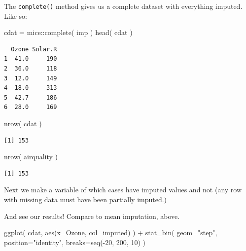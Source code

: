\documentclass[
  letterpaper,
  DIV=11,
  numbers=noendperiod]{scrreprt}
\newenvironment{Shaded}{}{}
\newcommand{\AttributeTok}[1]{\textcolor[rgb]{0.49,0.56,0.16}{#1}}
\newcommand{\DecValTok}[1]{\textcolor[rgb]{0.25,0.63,0.44}{#1}}
\newcommand{\FunctionTok}[1]{\textcolor[rgb]{0.02,0.16,0.49}{#1}}
\newcommand{\NormalTok}[1]{#1}
\newcommand{\OtherTok}[1]{\textcolor[rgb]{0.00,0.44,0.13}{#1}}
\newcommand{\SpecialCharTok}[1]{\textcolor[rgb]{0.25,0.44,0.63}{#1}}
\newcommand{\StringTok}[1]{\textcolor[rgb]{0.25,0.44,0.63}{#1}}
\begin{document}
The \texttt{complete()} method gives us a complete dataset with
everything imputed. Like so:

\begin{Shaded}
\begin{Highlighting}[]
\NormalTok{  cdat }\OtherTok{=}\NormalTok{ mice}\SpecialCharTok{::}\FunctionTok{complete}\NormalTok{( imp )}
  \FunctionTok{head}\NormalTok{( cdat )}
\end{Highlighting}
\end{Shaded}

\begin{verbatim}
  Ozone Solar.R
1  41.0     190
2  36.0     118
3  12.0     149
4  18.0     313
5  42.7     186
6  28.0     169
\end{verbatim}

\begin{Shaded}
\begin{Highlighting}[]
  \FunctionTok{nrow}\NormalTok{( cdat )}
\end{Highlighting}
\end{Shaded}

\begin{verbatim}
[1] 153
\end{verbatim}

\begin{Shaded}
\begin{Highlighting}[]
  \FunctionTok{nrow}\NormalTok{( airquality )}
\end{Highlighting}
\end{Shaded}

\begin{verbatim}
[1] 153
\end{verbatim}

Next we make a variable of which cases have imputed values and not (any
row with missing data must have been partially imputed.)

\begin{Shaded}
\end{Shaded}

And see our results! Compare to mean imputation, above.

\begin{Shaded}
\begin{Highlighting}[]
\FunctionTok{ggplot}\NormalTok{( cdat, }\FunctionTok{aes}\NormalTok{(}\AttributeTok{x=}\NormalTok{Ozone, }\AttributeTok{col=}\NormalTok{imputed) ) }\SpecialCharTok{+}
    \FunctionTok{stat\_bin}\NormalTok{( }\AttributeTok{geom=}\StringTok{"step"}\NormalTok{, }\AttributeTok{position=}\StringTok{"identity"}\NormalTok{,}
              \AttributeTok{breaks=}\FunctionTok{seq}\NormalTok{(}\SpecialCharTok{{-}}\DecValTok{20}\NormalTok{, }\DecValTok{200}\NormalTok{, }\DecValTok{10}\NormalTok{) )}
\end{Highlighting}
\end{Shaded}
\end{document}
